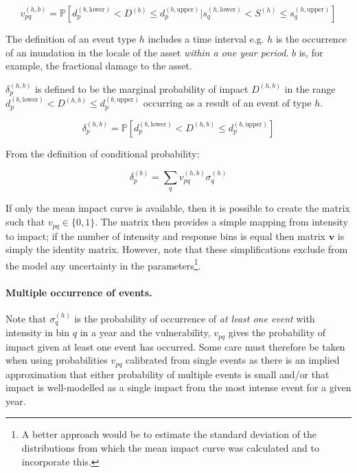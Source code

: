 \documentclass[a4paper,11pt]{extarticle} %
\begin{document}
\begin{equation}
    \label{Eq:vulnerability}
    v^{(h, b)}_{pq} = \mathbb{P} \left[ d^{(b,\text{lower})}_p < D^{(b)} \le d^{(b,\text{upper})}_p | s^{(h, \text{lower})}_q < S^{(h)} \le s^{(h, \text{upper})}_q \right]
\end{equation}

The definition of an event type $h$ includes a time interval e.g. $h$ is the occurrence of an inundation in the locale of the asset {\it within a one year period}. $b$ is, for example, the fractional damage to the asset.

$\delta^{(h,b)}_p$ is defined to be the marginal probability of impact $D^{(h, b)}$ in the range $d^{(b, \text{lower})}_p < D^{(h, b)} \le d^{(b,\text{upper})}_p$ occurring as a result of an event of type $h$.

\begin{equation}
    \label{Eq:impact}
    \delta^{(h, b)}_p =  \mathbb{P} \left[ d^{(b,\text{lower})}_p < D^{(h, b)} \le d^{(b,\text{upper})}_p \right]
\end{equation}

From the definition of conditional probability:

\begin{equation}
    \label{Eq:model}
    \delta^{(b)}_p = \sum_{q} v^{(h,b)}_{pq} \sigma^{(h)}_q
\end{equation}

If only the mean impact curve is available, then it is possible to create the matrix such that $v_{pq} \in \{0, 1\}$. The matrix then provides a simple mapping from intensity to impact; if the number of intensity and response bins is equal then matrix $\mathbf{v}$ is simply the identity matrix. However, note that these simplifications exclude from the model any uncertainty in the parameters\footnote{A better approach would be to estimate the standard deviation of the distributions from which the mean impact curve was calculated and to incorporate this.}.

\paragraph{Multiple occurrence of events.} Note that $\sigma^{(h)}_q$ is the probability of occurrence of \emph{at least one event} with intensity in bin $q$ in a year and the vulnerability, $v_{pq}$ gives the probability of impact given at least one event has occurred. Some care must therefore be taken when using probabilities $v_{pq}$ calibrated from single events as there is an implied approximation that either probability of multiple events is small and/or that impact is well-modelled as a single impact from the most intense event for a given year.
\end{document}
